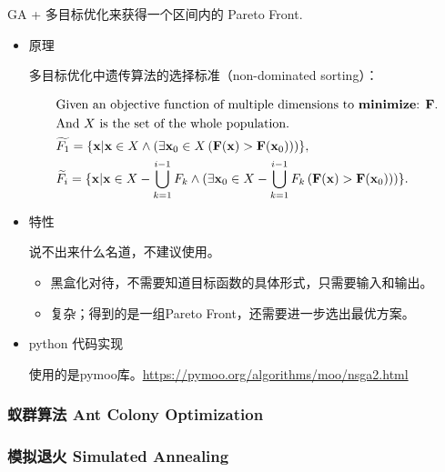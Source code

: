 \documentclass{article}
\begin{document}
GA + 多目标优化来获得一个区间内的 Pareto Front.

\begin{itemize}

\item{原理}

多目标优化中遗传算法的选择标准（non-dominated sorting）：

\begin{equation}
    \begin{split}
        & \text{Given an objective function of multiple dimensions to \textbf{minimize}: $\mathbf{F}$}. \\
        & \text{And $X$ is the set of the whole population.}\\
        & \widetilde{F_1} = \{\mathbf{x} | \mathbf{x} \in X \land ( \exists \mathbf{x}_0\in X \,(\mathbf{F}(\mathbf{x}) > \mathbf{F}(\mathbf{x}_0))) \}, \\
        & \widetilde{F_i} = \{\mathbf{x} | \mathbf{x} \in X - \bigcup_{k = 1}^{i - 1} F_k \land ( \exists \mathbf{x}_0\in X- \bigcup_{k = 1}^{i - 1} F_k \,(\mathbf{F}(\mathbf{x}) > \mathbf{F}(\mathbf{x}_0))) \}. \\
    \end{split}
\end{equation}

\item{特性}

说不出来什么名道，不建议使用。

\begin{itemize}
    \item 黑盒化对待，不需要知道目标函数的具体形式，只需要输入和输出。
    \item 复杂；得到的是一组Pareto Front，还需要进一步选出最优方案。
\end{itemize}

\item{python 代码实现}

使用的是pymoo库。\url{https://pymoo.org/algorithms/moo/nsga2.html}

\end{itemize}
\subsubsection{蚁群算法 Ant Colony Optimization}

\subsubsection{模拟退火 Simulated Annealing}
\end{document}
